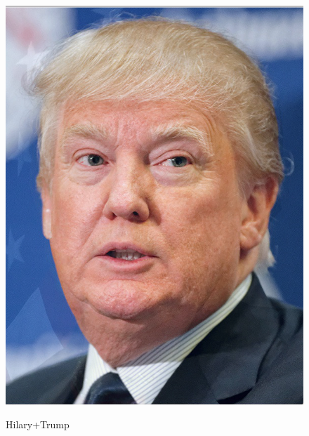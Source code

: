 \documentclass[a4paper]{article}
\begin{document}
\begin{figure}[htp]
{\begin{minipage}[b]{0.31\columnwidth}
{\includegraphics[width=1\columnwidth]{face_morphing/trump.png}
}
\label{fig:3-4:c}
\end{minipage}
}
\caption{Hilary+Trump}
\label{fig:3-4}
\end{figure}
\end{document}
